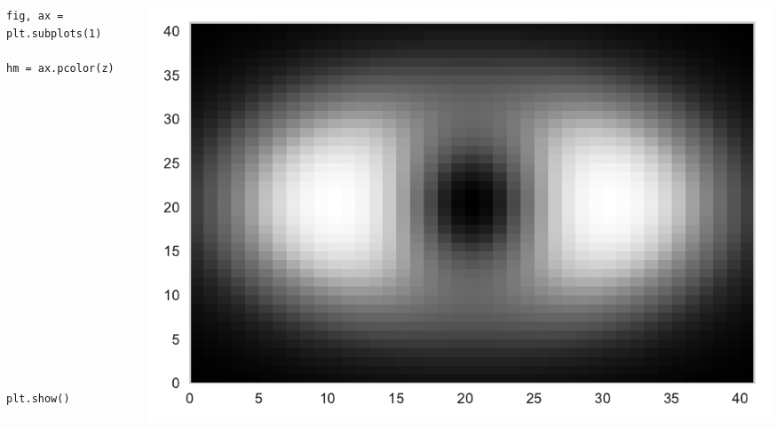 \documentclass{beamer}
\begin{document}
\begin{frame}[fragile]
\tiny{
\begin{columns}
\begin{column}{0.45\textwidth}
\begin{verbatim}
fig, ax = plt.subplots(1)

hm = ax.pcolor(z)


















plt.show()
\end{verbatim}
\end{column}
\begin{column}{0.55\textwidth}
\includegraphics[width=\textwidth]{../heatmap_1.pdf}
\end{column}
\end{columns}
}
\end{frame}
\end{document}
